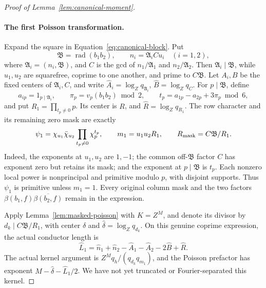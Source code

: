 \documentclass[11pt,a4paper]{article}
\numberwithin{equation}{section}
\numberwithin{figure}{section}
\theoremstyle{definition}
\theoremstyle{remark}
\begin{document}
\begin{proof}[Proof of Lemma~\ref{lem:canonical-moment}]
\paragraph{The first Poisson transformation.}
Expand the square in Equation~\eqref{eq:canonical-block}.  Put
\[
 \mathfrak B=\operatorname{rad}(b_1b_2),\qquad
 n_i=\mathfrak A_i C u_i\quad(i=1,2),
\]
where \(\mathfrak A_i=(n_i,\mathfrak B)\), and \(C\) is the gcd of
\(n_1/\mathfrak A_1\) and \(n_2/\mathfrak A_2\).  Then
\(\mathfrak A_i\mid\mathfrak B\), while \(u_1,u_2\) are squarefree,
coprime to one another, and prime to \(C\mathfrak B\).  Let \(A_i,B\)
be the fixed centers of \(\mathfrak A_i,C\), and write
\(\widehat A_i=\log_Zq_{\mathfrak A_i}\), \(\widehat B=\log_Zq_C\).
For \(p\mid\mathfrak B\), define
\[
 a_{ip}=1_{p\mid\mathfrak A_i},\qquad
 \pi_p=v_p(b_1b_2)\bmod2,\qquad
 t_p=a_{1p}-a_{2p}+3\pi_p\bmod6,
\]
and put \(R_1=\prod_{t_p\ne0}p\).  Its center is \(R\), and
\(\widehat R=\log_Zq_{R_1}\).
The row character and its remaining zero mask are exactly
\begin{equation}\label{eq:first-masked-data}
 \psi_1=\chi_{u_1}\bar\chi_{u_2}
               \prod_{t_p\ne0}\chi_p^{t_p},\qquad
 m_1=u_1u_2R_1,\qquad
 R_{\rm mask}=C\mathfrak B/R_1.
\end{equation}
Indeed, the exponents at \(u_1,u_2\) are \(1,-1\); the common
off-\(\mathfrak B\) factor \(C\) has exponent zero but retains its
mask; and the exponent at \(p\mid\mathfrak B\) is \(t_p\).  Each
nonzero local power is nonprincipal and primitive modulo \(p\), with
disjoint supports.  Thus \(\psi_1\) is primitive unless \(m_1=1\).
Every original column mask and the two factors
\(\beta(b_1,f)\overline{\beta(b_2,f)}\) remain in the expression.

Apply Lemma~\ref{lem:masked-poisson} with \(K=Z^M\), and denote its
divisor by \(d_k\mid C\mathfrak B/R_1\), with center \(\delta\) and
\(\widehat\delta=\log_Zq_{d_k}\).  On this genuine coprime expression,
the actual conductor length is
\begin{equation}\label{eq:first-poisson-lengths}
 \widehat L_1=\widehat n_1+\widehat n_2-\widehat A_1-\widehat A_2
                    -2\widehat B+\widehat R.
\end{equation}
The actual kernel argument is \(Z^Mq_h/(q_{d_k}q_{m_1})\), and the
Poisson prefactor has exponent \(M-\widehat\delta-\widehat L_1/2\).
We have not yet truncated or Fourier-separated this kernel.


\end{proof}
\end{document}
